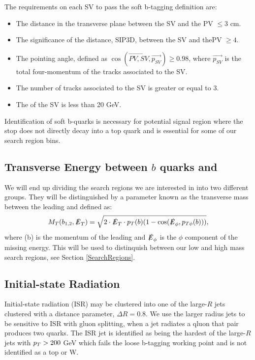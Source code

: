 The requirements on each SV to pass the soft b-tagging definition are:
\begin{itemize}
	 \item The distance in the transverse plane between the SV and the PV $\leq3$ cm.
	 \item The significance of the distance, SIP3D, between the SV and thePV $\geq4$.
	 \item The pointing angle, defined as $\cos(\overrightarrow{PV,SV},\overrightarrow{p_{SV}})\geq0.98$, where $\overrightarrow{p_{SV}}$ is the total four-momentum of the tracks associated to the SV. 
	 \item The number of tracks associated to the SV is greater or equal to 3.
	 \item The \pt{} of the SV is less than 20 GeV.
\end{itemize}
Identification of soft b-quarks is necessary for potential signal region where the stop does not directly decay into a top quark and is essential for some of our search region bins. 

\subsection{Transverse Energy between $b$ quarks and \met}
We will end up dividing the search regions we are interested in into two different groups. They will be distinguished by a parameter known as the transverse mass between the leading \bjet{} and \met{} defined as:
\begin{equation}\label{TransverseMass}
M_{T}(b_{1,2},\slashed{E}_{T})=\sqrt{2\cdot\slashed{E}_{T}\cdot p_{T}(b)(1-\cos(\slashed{E}_\phi,p_{T\phi}(b)))},
\end{equation}
where \pt(b) is the momentum of the leading \bjet{} and $\slashed{E}_\phi$ is the $\phi$ component of the missing energy. This will be used to distinquish between our low and high mass search regions, see Section \ref{SearchRegions}.


\subsection{Initial-state Radiation}\label{ISRpt}

Initial-state radiation (ISR) may be clustered into one of the large-$R$ jets clustered with a distance parameter, $\Delta R=0.8$. We use the larger radius jets to be sensitive to ISR with gluon splitting, when a jet radiates a qluon that pair produces two quarks. The ISR jet is identified as being the hardest of the large-$R$ jets with $p_{T}>200$ GeV which fails the loose b-tagging working point and is not identified as a top or W. 
 
